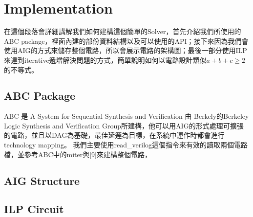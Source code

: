 \section{Implementation}
在這個段落會詳細講解我們如何建構這個簡單的Solver，首先介紹我們所使用的ABC package，裡面內建的部份資料結構以及可以使用的API；接下來因為我們會使用AIG的方式來儲存整個電路，所以會展示電路的架構圖；最後一部分使用ILP來達到iterative遞增解決問題的方式，簡單說明如何以電路設計類似$a+b+c \geq 2$的不等式。
\subsection{ABC Package}
ABC 是 A System for Sequential Synthesis and Verification 由 Berkely的Berkeley Logic Synthesis and Verification Group所建構，他可以用AIG的形式處理可擴張的電路，並且以DAG為基礎，最佳延遲為目標，在系統中運作時都會進行technology mapping。
我們主要使用read_verilog這個指令來有效的讀取兩個電路檔，並參考ABC中的miter與[9]來建構整個電路，
\subsection{AIG Structure}
\subsection{ILP Circuit}
